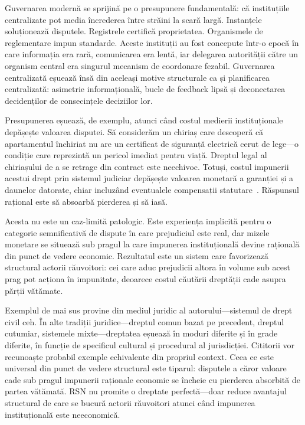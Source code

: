 \documentclass[11pt,a4paper,twocolumn]{article}
\begin{document}
Guvernarea modernă se sprijină pe o presupunere fundamentală: că instituțiile centralizate pot media încrederea între străini la scară largă. Instanțele soluționează disputele. Registrele certifică proprietatea. Organismele de reglementare impun standarde. Aceste instituții au fost concepute într-o epocă în care informația era rară, comunicarea era lentă, iar delegarea autorității către un organism central era singurul mecanism de coordonare fezabil. Guvernarea centralizată eșuează însă din aceleași motive structurale ca și planificarea centralizată: asimetrie informațională, bucle de feedback lipsă și deconectarea decidenților de consecințele deciziilor lor.

Presupunerea eșuează, de exemplu, atunci când costul medierii instituționale depășește valoarea disputei. Să considerăm un chiriaș care descoperă că apartamentul închiriat nu are un certificat de siguranță electrică cerut de lege---o condiție care reprezintă un pericol imediat pentru viață. Dreptul legal al chiriașului de a se retrage din contract este neechivoc. Totuși, costul impunerii acestui drept prin sistemul judiciar depășește valoarea monetară a garanției și a daunelor datorate, chiar incluzând eventualele compensații statutare~\cite{czcourtfees}. Răspunsul rațional este să absoarbă pierderea și să iasă.

Acesta nu este un caz-limită patologic. Este experiența implicită pentru o categorie semnificativă de dispute în care prejudiciul este real, dar mizele monetare se situează sub pragul la care impunerea instituțională devine rațională din punct de vedere economic. Rezultatul este un sistem care favorizează structural actorii răuvoitori: cei care aduc prejudicii altora în volume sub acest prag pot acționa în impunitate, deoarece costul căutării dreptății cade asupra părții vătămate.

Exemplul de mai sus provine din mediul juridic al autorului---sistemul de drept civil ceh. În alte tradiții juridice---dreptul comun bazat pe precedent, dreptul cutumiar, sistemele mixte---dreptatea eșuează în moduri diferite și în grade diferite, în funcție de specificul cultural și procedural al jurisdicției. Cititorii vor recunoaște probabil exemple echivalente din propriul context. Ceea ce este universal din punct de vedere structural este tiparul: disputele a căror valoare cade sub pragul impunerii raționale economic se încheie cu pierderea absorbită de partea vătămată. RSN nu promite o dreptate perfectă---doar reduce avantajul structural de care se bucură actorii răuvoitori atunci când impunerea instituțională este neeconomică.
\end{document}
